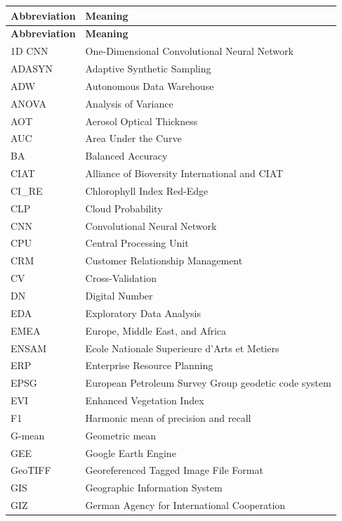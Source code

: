 
\begin{longtable}{@{}p{3cm}p{10cm}@{}}
\toprule
\textbf{Abbreviation} & \textbf{Meaning} \\
\midrule
\endfirsthead
\toprule
\textbf{Abbreviation} & \textbf{Meaning} \\
\midrule
\endhead
\bottomrule
\endlastfoot

1D CNN & One-Dimensional Convolutional Neural Network \\
ADASYN & Adaptive Synthetic Sampling \\
ADW & Autonomous Data Warehouse \\
ANOVA & Analysis of Variance \\
AOT & Aerosol Optical Thickness \\
AUC & Area Under the Curve \\
BA & Balanced Accuracy \\
CIAT & Alliance of Bioversity International and CIAT \\
CI\_RE & Chlorophyll Index Red-Edge \\
CLP & Cloud Probability \\
CNN & Convolutional Neural Network \\
CPU & Central Processing Unit \\
CRM & Customer Relationship Management \\
CV & Cross-Validation \\
DN & Digital Number \\
EDA & Exploratory Data Analysis \\
EMEA & Europe, Middle East, and Africa \\
ENSAM & Ecole Nationale Superieure d'Arts et Metiers \\
ERP & Enterprise Resource Planning \\
EPSG & European Petroleum Survey Group geodetic code system \\
EVI & Enhanced Vegetation Index \\
F1 & Harmonic mean of precision and recall \\
G-mean & Geometric mean \\
GEE & Google Earth Engine \\
GeoTIFF & Georeferenced Tagged Image File Format \\
GIS & Geographic Information System \\
GIZ & German Agency for International Cooperation \\

\end{longtable}
